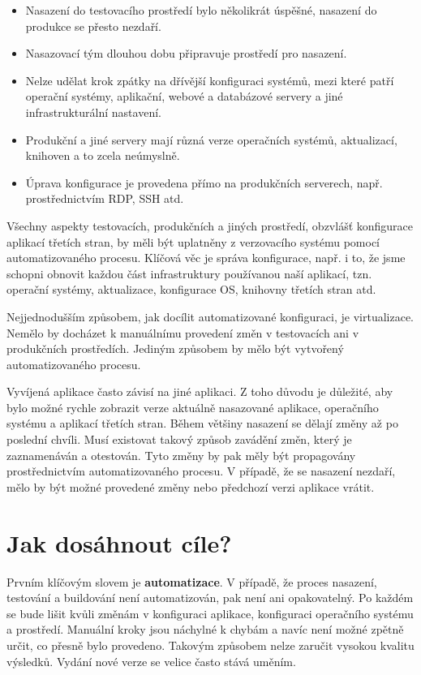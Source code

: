\begin{itemize}
  \item Nasazení do testovacího prostředí bylo několikrát úspěšné, nasazení do produkce se přesto nezdaří.
  \item Nasazovací tým dlouhou dobu připravuje prostředí pro nasazení.
  \item Nelze udělat krok zpátky na dřívější konfiguraci systémů, mezi které patří operační systémy, aplikační, webové a databázové servery a jiné infrastrukturální nastavení.
  \item Produkční a jiné servery mají různá verze operačních systémů, aktualizací, knihoven a to zcela neúmyslně.
  \item Úprava konfigurace je provedena přímo na produkčních serverech, např. prostřednictvím RDP, SSH atd.
\end{itemize}

Všechny aspekty testovacích, produkčních a jiných prostředí, obzvlášť konfigurace aplikací třetích stran, by měli být uplatněny z verzovacího systému pomocí automatizovaného procesu. Klíčová věc je správa konfigurace, např. i to, že jsme schopni obnovit každou část infrastruktury používanou naší aplikací, tzn. operační systémy, aktualizace, konfigurace OS, knihovny třetích stran atd. 

Nejjednodušším způsobem, jak docílit automatizované konfiguraci, je virtualizace. Nemělo by docházet k manuálnímu provedení změn v testovacích ani v produkčních prostředích. Jediným způsobem by mělo být vytvořený automatizovaného procesu.

Vyvíjená aplikace často závisí na jiné aplikaci. Z toho důvodu je důležité, aby bylo možné rychle zobrazit verze aktuálně nasazované aplikace, operačního systému a aplikací třetích stran. Během většiny nasazení se dělají změny až po poslední chvíli. Musí existovat takový způsob zavádění změn, který je zaznamenáván a otestován. Tyto změny by pak měly být propagovány prostřednictvím automatizovaného procesu. V případě, že se nasazení nezdaří, mělo by být možné provedené změny nebo předchozí verzi aplikace vrátit.

\section{Jak dosáhnout cíle?}
Prvním klíčovým slovem je \textbf{automatizace}. V případě, že proces nasazení, testování a buildování není automatizován, pak není ani opakovatelný. Po každém se bude lišit kvůli změnám v konfiguraci aplikace, konfiguraci operačního systému a prostředí. 
Manuální kroky jsou náchylné k chybám a navíc není možné zpětně určit, co přesně bylo provedeno. Takovým způsobem nelze zaručit vysokou kvalitu výsledků. Vydání nové verze se velice často stává uměním. 

